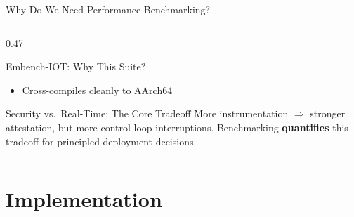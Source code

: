 \documentclass[aspectratio=169, 10pt]{beamer}
\begin{document}
\begin{frame}{Why Do We Need Performance Benchmarking?}
\begin{columns}[T]
\begin{column}{0.47\textwidth}
\begin{defbox}{Embench-IOT: Why This Suite?}
\begin{itemize}
                    \item Cross-compiles cleanly to AArch64
                \end{itemize}
            \end{defbox}
            \vspace{3pt}
            \begin{greenbox}{Security vs.\ Real-Time: The Core Tradeoff}
                \scriptsize More instrumentation $\Rightarrow$ stronger attestation,
                but more control-loop interruptions.
                Benchmarking \textbf{quantifies} this tradeoff for
                principled deployment decisions.
            \end{greenbox}
        \end{column}
    \end{columns}
\end{frame}

\section{Implementation}
\end{document}
